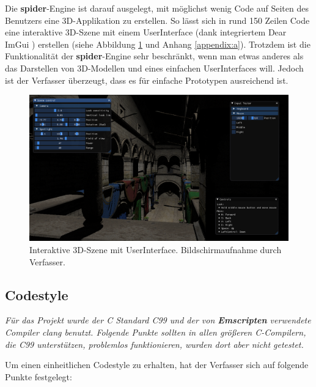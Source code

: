 \documentclass[oneside]{ausarbeitung}
\begin{document}
Die \textbf{spider}-Engine ist darauf ausgelegt, mit möglichst wenig Code auf Seiten des Benutzers eine 3D-Applikation zu erstellen. So lässt sich in rund 150 Zeilen Code eine interaktive 3D-Szene mit einem UserInterface (dank integriertem Dear ImGui \cite{dear_imgui}) erstellen (siehe Abbildung \ref{fig:spider_example_sponza} und Anhang \ref{appendix:a}). Trotzdem ist die Funktionalität der \textbf{spider}-Engine sehr beschränkt, wenn man etwas anderes als das Darstellen von 3D-Modellen und eines einfachen UserInterfaces will. Jedoch ist der Verfasser überzeugt, dass es für einfache Prototypen ausreichend ist.

\begin{figure}
    \includegraphics[width=\textwidth]{images/state_of_work_20200608.png}
    \caption{Interaktive 3D-Szene mit UserInterface. Bildschirmaufnahme durch Verfasser.}
    \label{fig:spider_example_sponza}
\end{figure}

\subsection{Codestyle}
\label{sub:codestyle}
\textit{Für das Projekt wurde der C Standard C99 und der von \textbf{Emscripten} verwendete Compiler clang benutzt. Folgende Punkte sollten in allen größeren C-Compilern, die C99 unterstützen, problemlos funktionieren, wurden dort aber nicht getestet.}

Um einen einheitlichen Codestyle zu erhalten, hat der Verfasser sich auf folgende Punkte festgelegt:
\end{document}
